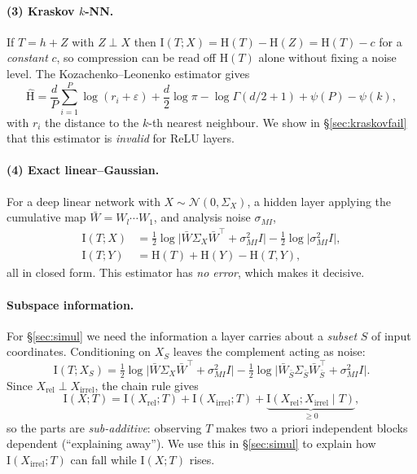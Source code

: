 \documentclass[11pt,a4paper]{article}
\newcommand{\I}{\mathrm{I}}
\newcommand{\HH}{\mathrm{H}}
\newcommand{\Norm}{\mathcal{N}}
\newcommand{\Wb}{\bar{W}}
\newcommand{\smi}{\sigma_{MI}}
\begin{document}
\paragraph{(3) Kraskov $k$-NN.} If $T=h+Z$ with $Z\perp X$ then
$\I(T;X)=\HH(T)-\HH(Z)=\HH(T)-c$ for a \emph{constant} $c$, so compression can be
read off $\HH(T)$ alone without fixing a noise level. The
Kozachenko--Leonenko estimator \citep{kozachenko1987sample,kraskov2004estimating}
gives
\begin{equation}
  \hat{\HH} = \frac{d}{P}\sum_{i=1}^{P}\log(r_i+\varepsilon)
    + \frac{d}{2}\log\pi - \log\Gamma(d/2+1) + \psi(P) - \psi(k),
  \label{eq:kraskov}
\end{equation}
with $r_i$ the distance to the $k$-th nearest neighbour. We show in
\S\ref{sec:kraskovfail} that this estimator is \emph{invalid} for ReLU layers.

\paragraph{(4) Exact linear--Gaussian.} For a deep linear network with
$X\sim\Norm(0,\Sigma_X)$, a hidden layer applying the cumulative map
$\Wb = W_l\cdots W_1$, and analysis noise $\smi$,
\begin{align}
  \I(T;X) &= \tfrac12 \log\big|\Wb\Sigma_X\Wb^\top + \smi^2 I\big|
           - \tfrac12 \log\big|\smi^2 I\big|,
  \label{eq:exactx}\\
  \I(T;Y) &= \HH(T)+\HH(Y)-\HH(T,Y),
  \label{eq:exacty}
\end{align}
all in closed form. This estimator has \emph{no error}, which makes it decisive.

\paragraph{Subspace information.} For \S\ref{sec:simul} we need the information a
layer carries about a \emph{subset} $S$ of input coordinates. Conditioning on
$X_S$ leaves the complement acting as noise:
\begin{equation}
  \I(T;X_S) = \tfrac12\log\big|\Wb\Sigma_X\Wb^\top+\smi^2 I\big|
    - \tfrac12\log\big|\Wb_{\bar S}\Sigma_{\bar S}\Wb_{\bar S}^\top + \smi^2 I\big|.
  \label{eq:subspace}
\end{equation}
Since $X_{\mathrm{rel}} \perp X_{\mathrm{irrel}}$, the chain rule gives
\begin{equation}
  \I(X;T) = \I(X_{\mathrm{rel}};T) + \I(X_{\mathrm{irrel}};T)
          + \underbrace{\I(X_{\mathrm{rel}};X_{\mathrm{irrel}} \mid T)}_{\ge 0},
  \label{eq:subadd}
\end{equation}
so the parts are \emph{sub-additive}: observing $T$ makes two a priori
independent blocks dependent (``explaining away''). We use this in
\S\ref{sec:simul} to explain how $\I(X_{\mathrm{irrel}};T)$ can fall while
$\I(X;T)$ rises.
\end{document}
